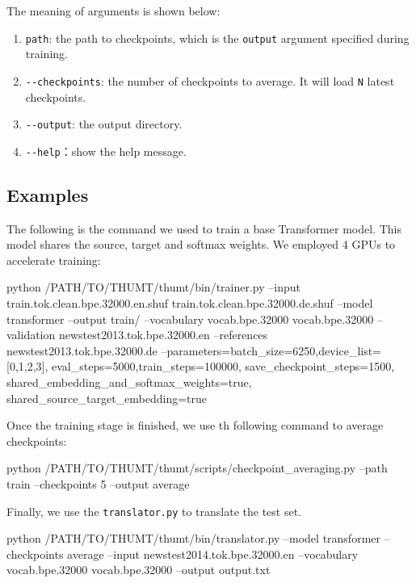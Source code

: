 \documentclass{article}
\begin{document}
The meaning of arguments is shown below:
\begin{enumerate}
\item \verb|path|: the path to checkpoints, which is the \verb|output| argument specified during training.
\item \verb|--checkpoints|: the number of checkpoints to average. It will load \verb|N| latest checkpoints.
\item \verb|--output|: the output directory.
\item \verb|--help|：show the help message.
\end{enumerate}


\subsection{Examples}
The following is the command we used to train a base Transformer model. This model shares the source, target and softmax weights. We employed 4 GPUs to accelerate training:
\begin{everbatim}
python /PATH/TO/THUMT/thumt/bin/trainer.py
  --input train.tok.clean.bpe.32000.en.shuf
          train.tok.clean.bpe.32000.de.shuf
  --model transformer --output train/
  --vocabulary vocab.bpe.32000 vocab.bpe.32000
  --validation newstest2013.tok.bpe.32000.en
  --references newstest2013.tok.bpe.32000.de
  --parameters=batch_size=6250,device_list=[0,1,2,3],
               eval_steps=5000,train_steps=100000,
               save_checkpoint_steps=1500,
               shared_embedding_and_softmax_weights=true,
               shared_source_target_embedding=true
\end{everbatim}

Once the training stage is finished, we use th following command to average checkpoints:
\begin{everbatim}
python /PATH/TO/THUMT/thumt/scripts/checkpoint_averaging.py
  --path train --checkpoints 5 --output average
\end{everbatim}

Finally, we use the \verb|translator.py| to translate the test set.
\begin{everbatim}
python /PATH/TO/THUMT/thumt/bin/translator.py
  --model transformer
  --checkpoints average
  --input newstest2014.tok.bpe.32000.en
  --vocabulary vocab.bpe.32000 vocab.bpe.32000
  --output output.txt
\end{everbatim}



\end{document}
